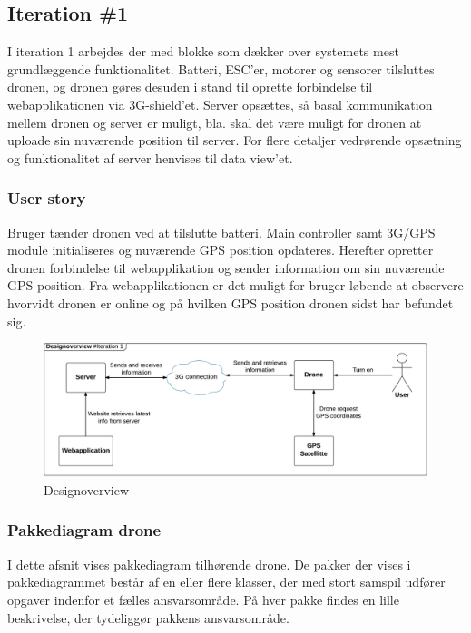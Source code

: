\subsection{Iteration \#1}
\vspace{-0.6cm}
I iteration 1 arbejdes der med blokke som dækker over systemets mest grundlæggende funktionalitet. Batteri, ESC’er, motorer og sensorer tilsluttes dronen, og dronen gøres desuden i stand til oprette forbindelse til webapplikationen via 3G-shield’et.
Server opsættes, så basal kommunikation mellem dronen og server er muligt, bla. skal det være muligt for dronen at uploade sin nuværende position til server. For flere detaljer vedrørende opsætning og funktionalitet af server henvises til data view'et. 

\subsubsection*{User story}
\vspace{-0.4cm}
Bruger tænder dronen ved at tilslutte batteri. Main controller samt 3G/GPS module initialiseres og nuværende GPS position opdateres. Herefter opretter dronen forbindelse til webapplikation og sender information om sin nuværende GPS position. Fra webapplikationen er det muligt for bruger løbende at observere hvorvidt dronen er online og på hvilken GPS position dronen sidst har befundet sig.

\begin{figure}[H]
	\centering
	\includegraphics[width=1\textwidth]{Billeder/design_overview/design_overview_iteration1.png}
	\vspace{-.7cm}
	\caption{Designoverview}
	\label{fig:design_overview_iteration_1}
\end{figure}


\newpage
\subsubsection*{Pakkediagram drone}

I dette afsnit vises pakkediagram tilhørende drone. De pakker der vises i pakkediagrammet består af en eller flere klasser, der med stort samspil udfører opgaver indenfor et fælles ansvarsområde. På hver pakke findes en lille beskrivelse, der tydeliggør pakkens ansvarsområde. 


